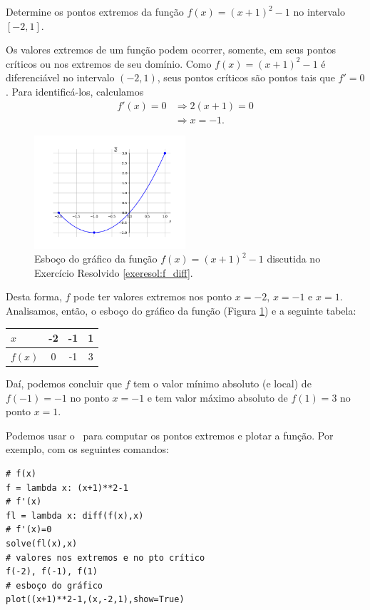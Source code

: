 \begin{exeresol}\label{exeresol:f_diff}
  Determine os pontos extremos da função $f(x) = (x+1)^2-1$ no intervalo $[-2,1]$.
\end{exeresol}
\begin{resol}
  Os valores extremos de um função podem ocorrer, somente, em seus pontos críticos ou nos extremos de seu domínio. Como $f(x) = (x+1)^2-1$ é diferenciável no intervalo $(-2,1)$, seus pontos críticos são pontos tais que $f'=0$. Para identificá-los, calculamos
  \begin{align}
    f'(x)=0 &\Rightarrow 2(x+1) = 0\\
            &\Rightarrow x = -1.
  \end{align}

  \begin{figure}[H]
    \centering
    \includegraphics[width=0.5\textwidth]{./cap_apderiv/dados/fig_exeresol_f_diff/fig_exeresol_f_diff}
    \caption{Esboço do gráfico da função $f(x) = (x+1)^2-1$ discutida no Exercício Resolvido \ref{exeresol:f_diff}.}
    \label{fig:exeresol_f_diff}
  \end{figure}

  Desta forma, $f$ pode ter valores extremos nos ponto $x=-2$, $x=-1$ e $x=1$. Analisamos, então, o esboço do gráfico da função (Figura \ref{fig:exeresol_f_diff}) e a seguinte tabela:\\
  \begin{center}
  \begin{tabular}[H]{l|ccc}
    $x$ & -2 & -1 & 1 \\\hline
    $f(x)$ & 0 & -1 & 3\\\hline
  \end{tabular}
\end{center}
Daí, podemos concluir que $f$ tem o valor mínimo absoluto (e local) de $f(-1)=-1$ no ponto $x=-1$ e tem valor máximo absoluto de $f(1)=3$ no ponto $x=1$.

\begin{ifispython}
  Podemos usar o \sympy~para computar os pontos extremos e plotar a função. Por exemplo, com os seguintes comandos:
\begin{verbatim}
# f(x)
f = lambda x: (x+1)**2-1
# f'(x)
fl = lambda x: diff(f(x),x)
# f'(x)=0
solve(fl(x),x)
# valores nos extremos e no pto crítico
f(-2), f(-1), f(1)
# esboço do gráfico
plot((x+1)**2-1,(x,-2,1),show=True)
\end{verbatim}
\end{ifispython}
\end{resol}

